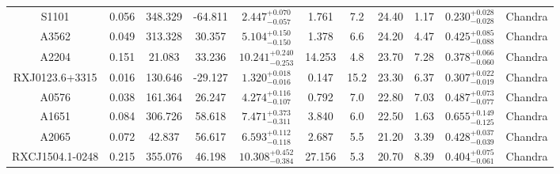 \documentclass{aa}   %
\begin{document}
\begin{table}[ht!]
\begin{center}
\begin{tabular}{ c  c  c  c c c c c c c c }
S1101               		&		0.056	&	348.329	&	-64.811	& $	2.447^{+0.070}_{-0.057}$  &      1.761	&  7.2	&	24.40	&	1.17	&	$ 0.230^{+0.028}_{-0.028}  $ &	  Chandra     \\
A3562               		&		0.049	&	313.328	&	30.357	& $	5.104^{+0.150}_{-0.150}$  &      1.378	&  6.6	&	24.20	&	4.47	&	$ 0.425^{+0.085}_{-0.088}  $ &	  Chandra     \\
A2204               		&		0.151	&	21.083	&	33.236	& $ 10.241^{+0.240}_{-0.253}$ &     14.253	&  4.8	&	23.70	&	7.28	&	$ 0.378^{+0.066}_{-0.060}  $ &	 Chandra      \\
RXJ0123.6+3315      		&		0.016	&	130.646	&	-29.127	& $	1.320^{+0.018}_{-0.016}$  &      0.147	&  15.2	&	23.30	&	6.37	&	$ 0.307^{+0.022}_{-0.019}  $ &	 Chandra      \\
A0576               		&		0.038	&	161.364	&	26.247	& $	4.274^{+0.116}_{-0.107}$  &      0.792	&  7.0	&	22.80	&	7.03	&	$ 0.487^{+0.073}_{-0.077}  $ &	 Chandra      \\
A1651               		&		0.084	&	306.726	&	58.618	& $	7.471^{+0.373}_{-0.311}$  &      3.840	&  6.0	&	22.50	&	1.63	&	$ 0.655^{+0.149}_{-0.125}  $ &	  Chandra     \\
A2065               		&		0.072	&	42.837	&	56.617	& $	6.593^{+0.112}_{-0.118}$  &      2.687	&  5.5	&	21.20	&	3.39	&	$ 0.428^{+0.037}_{-0.039}  $ &	  Chandra     \\
RXCJ1504.1-0248     		&		0.215	&	355.076	&	46.198	& $ 10.308^{+0.452}_{-0.384}$ &      27.156	&  5.3	&	20.70	&	8.39	&	$ 0.404^{+0.075}_{-0.061}  $ &	 Chandra      \\

 \hline 
 

\end{tabular}
\end{center}
\end{table}

\clearpage
\end{document}
